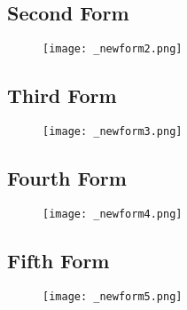 \pagebreak
\subsection{Second Form}
\begin{figure}[h]                %
	\centering                    %
	\texttt{[image: \_newform2.png]}      %
	\label{}
\end{figure}

\pagebreak
\subsection{Third Form}
\begin{figure}[h]                %
	\centering                    %
	\texttt{[image: \_newform3.png]}      %
	\label{}
\end{figure}

\pagebreak
\subsection{Fourth Form}
\begin{figure}[h]                %
	\centering                    %
	\texttt{[image: \_newform4.png]}      %
	\label{}
\end{figure}

\pagebreak
\subsection{Fifth Form}
\begin{figure}[h]                %
	\centering                    %
	\texttt{[image: \_newform5.png]}      %
	\label{}
\end{figure}








